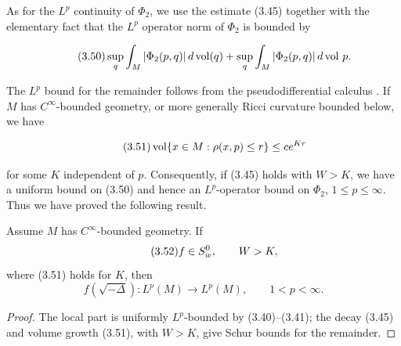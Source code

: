 As for the $L^{p}$ continuity of $\Phi_{2}$, we use the estimate (3.45) together with the elementary fact that the $L^{p}$ operator norm of $\Phi_{2}$ is bounded by

\begin{equation}\tag{3.50}
\sup_{q}\int_{M}|\Phi_{2}(p,q)|\,d\operatorname{vol}(q)+\sup_{q}\int_{M}|\Phi_{2}(p,q)|\,d\operatorname{vol}\,p.
\end{equation}

The $L^p$ bound for the remainder follows from the pseudodifferential
calculus \cite[Chapter~XIII]{cgt-taylor-pdo}. If $M$ has
$C^{\infty}$-bounded geometry, or more generally Ricci curvature bounded below,
we have

\begin{equation}\tag{3.51}
\operatorname{vol}\{x\in M:\rho(x,p)\leq r\}\leq ce^{Kr}
\end{equation}

for some $K$ independent of $p$. Consequently, if (3.45) holds with $W>K$, we have a uniform bound on (3.50) and hence an $L^{p}$-operator bound on $\Phi_{2}$, $1\leq p\leq \infty$. Thus we have proved the following result.

\begin{theorem}
\label{thm:lp-continuity-strip-holomorphic-symbols}

Assume $M$ has $C^{\infty}$-bounded geometry. If
\begin{equation}\tag{3.52}
f\in S^{0}_{w}, \qquad W>K,
\end{equation}
where (3.51) holds for $K$, then
\begin{equation}\tag{3.53}
f(\sqrt{-\Delta}): L^{p}(M)\to L^{p}(M), \qquad 1<p<\infty.
\end{equation}
\end{theorem}
\begin{proof}
\sketch The local part is uniformly $L^p$-bounded by (3.40)--(3.41); the decay (3.45) and volume growth (3.51), with $W>K$, give Schur bounds for the remainder.
\end{proof}
